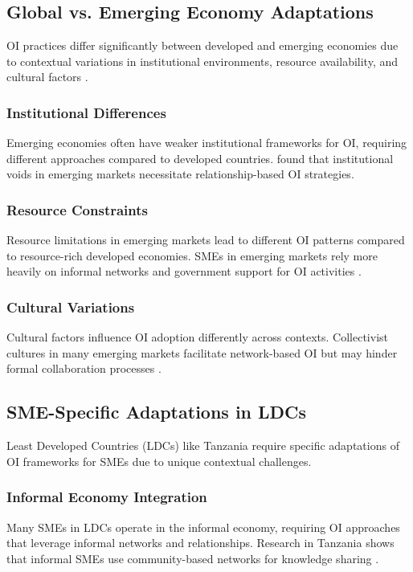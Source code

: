 \subsection{Global vs. Emerging Economy Adaptations}

OI practices differ significantly between developed and emerging economies due to contextual variations in institutional environments, resource availability, and cultural factors \citep{zahra2008theoretical}.

\subsubsection{Institutional Differences}
Emerging economies often have weaker institutional frameworks for OI, requiring different approaches compared to developed countries. \cite{wright2005strategy} found that institutional voids in emerging markets necessitate relationship-based OI strategies.

\subsubsection{Resource Constraints}
Resource limitations in emerging markets lead to different OI patterns compared to resource-rich developed economies. SMEs in emerging markets rely more heavily on informal networks and government support for OI activities \citep{manolopoulos2006determining}.

\subsubsection{Cultural Variations}
Cultural factors influence OI adoption differently across contexts. Collectivist cultures in many emerging markets facilitate network-based OI but may hinder formal collaboration processes \citep{shan2016cultural}.

\subsection{SME-Specific Adaptations in LDCs}

Least Developed Countries (LDCs) like Tanzania require specific adaptations of OI frameworks for SMEs due to unique contextual challenges.

\subsubsection{Informal Economy Integration}
Many SMEs in LDCs operate in the informal economy, requiring OI approaches that leverage informal networks and relationships. Research in Tanzania shows that informal SMEs use community-based networks for knowledge sharing \citep{mnukwa2019innovation}.

